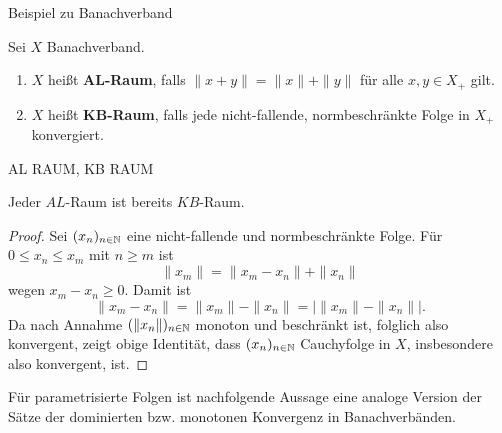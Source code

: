 \begin{bsp}
Beispiel zu Banachverband
\end{bsp}


\begin{defi} Sei $X$ Banachverband.
\begin{enumerate}
\item $X$ heißt \textbf{AL-Raum}, falls $\|x+y\|=\|x\|+\|y\|$ für alle $x,y\in X_+$ gilt.
\item $X$ heißt \textbf{KB-Raum}, falls jede nicht-fallende, normbeschränkte Folge in $X_+$ konvergiert.
\end{enumerate}
\end{defi}

\begin{bsp}
AL RAUM, KB RAUM
\end{bsp}



\begin{fsatz}
Jeder $AL$-Raum ist bereits $KB$-Raum.
\end{fsatz}

\begin{proof}
Sei $(x_n)_{n\in\mathbb{N}}$ eine nicht-fallende und normbeschränkte Folge. Für $0\leq x_n\leq x_m$ mit $n\geq m$ ist
\begin{equation*}
\|x_m\| = \|x_m - x_n\| + \|x_n\|
\end{equation*}
wegen $x_m - x_n\geq0$. Damit ist
\begin{equation*}
\|x_m - x_n\| = \|x_m \| - \|x_n\| = \big|\|x_m\| - \|x_n\| \big |.
\end{equation*}
Da nach Annahme $(\|x_n \|)_{n\in\mathbb{N}}$ monoton und beschränkt ist, folglich also konvergent, zeigt obige Identität, dass $(x_n)_{n\in\mathbb{N}}$ Cauchyfolge in $X$, insbesondere also konvergent, ist.
\end{proof}

\par
Für parametrisierte Folgen  ist nachfolgende Aussage eine analoge Version der Sätze der dominierten bzw. monotonen Konvergenz in Banachverbänden.

